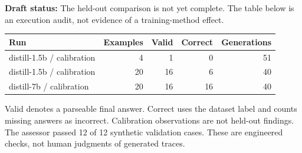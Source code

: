 \noindent\textbf{Draft status:} The held-out comparison is not yet complete. The table below is an execution audit, not evidence of a training-method effect.
\begin{center}
\begin{tabular}{lrrrr}
\toprule
Run & Examples & Valid & Correct & Generations \\
\midrule
distill-1.5b / calibration & 4 & 1 & 0 & 51 \\
distill-1.5b / calibration & 20 & 16 & 6 & 40 \\
distill-7b / calibration & 20 & 16 & 16 & 40 \\
\bottomrule
\end{tabular}
\end{center}
Valid denotes a parseable final answer. Correct uses the dataset label and counts missing answers as incorrect. Calibration observations are not held-out findings.
The assessor passed 12 of 12 synthetic validation cases. These are engineered checks, not human judgments of generated traces.
